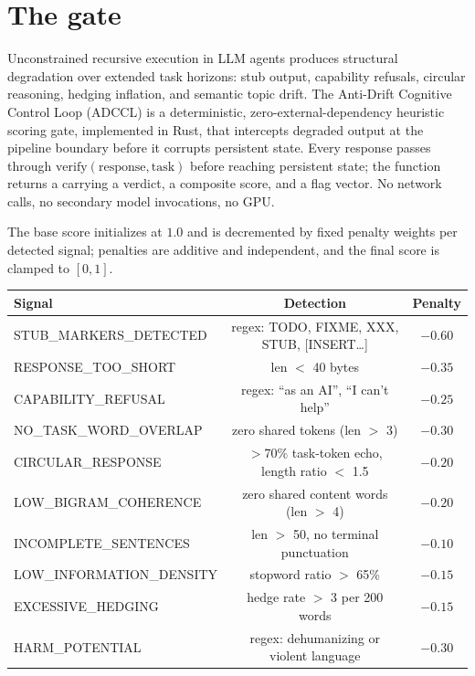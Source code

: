 \documentclass{alienfolio}
\begin{document}
\section{The gate}
Unconstrained recursive execution in LLM agents produces structural
degradation over extended task horizons: stub output, capability refusals,
circular reasoning, hedging inflation, and semantic topic drift. The
Anti-Drift Cognitive Control Loop (ADCCL) is a deterministic,
zero-external-dependency heuristic scoring gate, implemented in Rust, that
intercepts degraded output at the pipeline boundary before it corrupts
persistent state. Every response passes through
$\mathrm{verify}(\mathrm{response}, \mathrm{task})$ before reaching persistent
state; the function returns a  carrying a verdict, a
composite score, and a flag vector. No network calls, no secondary model
invocations, no GPU.

The base score initializes at $1.0$ and is decremented by fixed penalty
weights per detected signal; penalties are additive and independent, and the
final score is clamped to $[0,1]$. 

\begin{center}
{\small\begin{tabular}{lcc}
Signal & Detection & Penalty \\ \hline
STUB\_MARKERS\_DETECTED & regex: TODO, FIXME, XXX, STUB, [INSERT\ldots] & $-0.60$ \\
RESPONSE\_TOO\_SHORT & len $<$ 40 bytes & $-0.35$ \\
CAPABILITY\_REFUSAL & regex: ``as an AI'', ``I can't help'' & $-0.25$ \\
NO\_TASK\_WORD\_OVERLAP & zero shared tokens (len $>$ 3) & $-0.30$ \\
CIRCULAR\_RESPONSE & $>$70\% task-token echo, length ratio $<$ 1.5 & $-0.20$ \\
LOW\_BIGRAM\_COHERENCE & zero shared content words (len $>$ 4) & $-0.20$ \\
INCOMPLETE\_SENTENCES & len $>$ 50, no terminal punctuation & $-0.10$ \\
LOW\_INFORMATION\_DENSITY & stopword ratio $>$ 65\% & $-0.15$ \\
EXCESSIVE\_HEDGING & hedge rate $>$ 3 per 200 words & $-0.15$ \\
HARM\_POTENTIAL & regex: dehumanizing or violent language & $-0.30$ \\
\end{tabular}}
\end{center}
\end{document}
